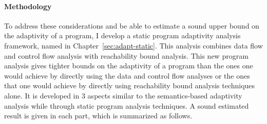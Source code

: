 \paragraph{Methodology}
To address these considerations and be able to estimate a sound upper bound on the adaptivity of a program, 
I develop a static program adaptivity analysis framework, named {\THESYSTEM} in Chapter~\ref{sec:adapt-static}.
This analysis combines data flow and control flow analysis with reachability bound analysis.
This new program analysis gives tighter bounds on the adaptivity of a program than the ones one would achieve 
by directly using the data and control flow analyses or the ones that one would achieve 
by directly using reachability bound analysis techniques alone. 
It is developed in 3 aspects similar to the semantics-based adaptivity analysis 
while through static program analysis techniques. 
A sound estimated result is given in each part, which is summarized as follows.
